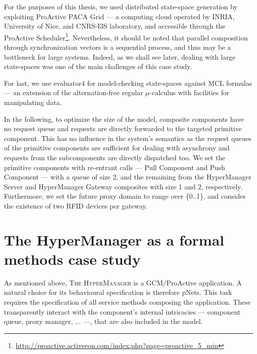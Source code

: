 		For the purposes of this thesis, we used distributed state-space generation by exploiting
	ProActive \textsf{PACA Grid} --- a computing cloud operated by INRIA, 
	University of Nice, and CNRS-I3S laboratory, and accessible through the 
	ProActive Scheduler\footnote{\url{http://proactive.activeeon.com/index.php?page=proactive_5_min}}.		
	Nevertheless, it should be noted that 	parallel composition through synchronization vectors
	is a sequential process, and thus may be a bottleneck for large systems. Indeed, as we shall see
	later, dealing with large state-spaces was one of the main challenges of this case study.
	
		
					
				
			 For last, we use \textsf{evaluator4} for model-checking state-spaces against 
    \ac{MCL} \cite{Mateescu:2008:MCL:1423684.1423700} formulas --- an extension of the
    alternation-free regular $\mu$-calculus \cite{WinskellMuCalc} with facilities for manipulating data.		

		In the following, to optimize the size of the model, composite components have no request queue and 
	requests are directly forwarded to the
    targeted primitive component. This has no influence in the system's semantics as the request queues of the primitive components are sufficient for dealing with asynchrony and requests from the subcomponents are directly 
    dispatched too. We set the primitive components 
    with re-entrant calls --- \textsf{Pull Component} and \textsf{Push Component} --- with a \textsf{queue} 
    of size 2, and the remaining from the \textsf{HyperManager Server}  
    and \textsf{HyperManager Gateway} composites with size 1 and 2, respectively. Furthermore,
	we set the future proxy domain to range over \{0..1\}, and consider the existence of
    two \ac{RFID} devices per gateway.

\section{The HyperManager as a formal methods case study}
\label{sec:spec}

		
		As mentioned above, \textsc{The HyperManager} is a \ac{GCM}/ProActive application. A natural
	choice for its behavioural specification is therefore pNets. This task requires the specification
	of all service methods composing the application. These transparently interact with
	the component's internal intricacies --- component queue, proxy manager, ... ---, 
	that are also included in the model.
	
